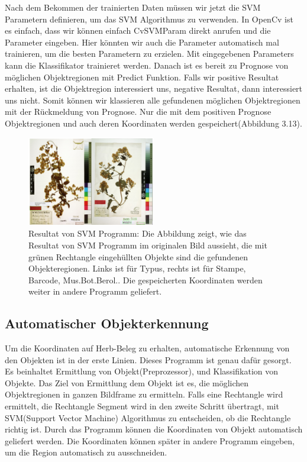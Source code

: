 \documentclass[10pt,a4paper]{report}
\begin{document}
Nach dem Bekommen der trainierten Daten müssen wir jetzt die SVM Parametern definieren, um das SVM Algorithmus zu verwenden. In OpenCv ist es einfach, dass wir können einfach CvSVMParam direkt anrufen und die Parameter eingeben. Hier könnten wir auch die Parameter automatisch mal trainieren, um die besten Parametern zu erzielen\cite{6}. 
Mit eingegebenen Parameters kann die Klassifikator trainieret werden. Danach ist es bereit zu Prognose von möglichen Objektregionen mit Predict Funktion. Falls wir positive Resultat erhalten, ist die Objektregion interessiert uns, negative Resultat, dann interessiert uns nicht. Somit können wir klassieren alle gefundenen möglichen Objektregionen mit der Rückmeldung von Prognose. Nur die mit dem positiven Prognose Objektregionen und auch deren Koordinaten werden gespeichert(Abbildung 3.13). \\
\begin{figure}[htbp] 
	\centering
	\includegraphics[width=0.5\textwidth]{Svmresult.png}
	\caption{Resultat von SVM Programm: Die Abbildung zeigt, wie das Resultat von SVM Programm im originalen Bild aussieht, die mit grünen Rechtangle eingehüllten Objekte sind die gefundenen Objekteregionen. Links ist für Typus, rechts ist für Stampe, Barcode, Mus.Bot.Berol.. Die gespeicherten Koordinaten werden weiter in andere Programm geliefert.
	}
	\label{fig:Bild 3.13}
\end{figure}

\subsection{Automatischer Objekterkennung}
Um die Koordinaten auf Herb-Beleg zu erhalten, automatische Erkennung von den Objekten ist in der erste Linien.  Dieses Programm ist genau dafür gesorgt. Es beinhaltet Ermittlung von Objekt(Preprozessor), und Klassifikation von Objekte.  Das Ziel von Ermittlung dem Objekt ist es, die möglichen Objektregionen in ganzen Bildframe zu ermitteln. Falls eine Rechtangle wird ermittelt, die Rechtangle Segment wird in den zweite Schritt übertragt, mit SVM(Support Vector Machine) Algorithmus zu entscheiden, ob die Rechtangle richtig ist. Durch das Programm können die Koordinaten von Objekt automatisch geliefert werden. Die Koordinaten können später in andere Programm eingeben, um die Region automatisch zu ausschneiden. 
\end{document}
